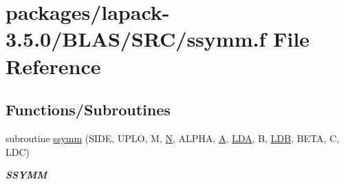 \hypertarget{lapack-3_85_80_2BLAS_2SRC_2ssymm_8f}{}\section{packages/lapack-\/3.5.0/\+B\+L\+A\+S/\+S\+R\+C/ssymm.f File Reference}
\label{lapack-3_85_80_2BLAS_2SRC_2ssymm_8f}
\subsection*{Functions/\+Subroutines}
\begin{DoxyCompactItemize}
\item 
subroutine \hyperlink{group__single__blas__level3_ga8e8391a9873114d97e2b63e39fe83b2e}{ssymm} (S\+I\+D\+E, U\+P\+L\+O, M, \hyperlink{polmisc_8c_a0240ac851181b84ac374872dc5434ee4}{N}, A\+L\+P\+H\+A, \hyperlink{classA}{A}, \hyperlink{example__user_8c_ae946da542ce0db94dced19b2ecefd1aa}{L\+D\+A}, B, \hyperlink{example__user_8c_a50e90a7104df172b5a89a06c47fcca04}{L\+D\+B}, B\+E\+T\+A, C, L\+D\+C)
\begin{DoxyCompactList}\small\item\em {\bfseries S\+S\+Y\+M\+M} \end{DoxyCompactList}\end{DoxyCompactItemize}
